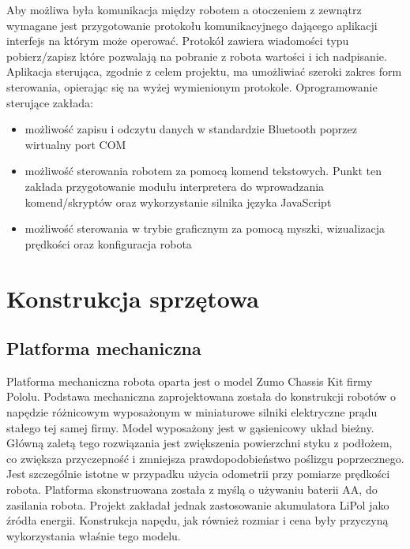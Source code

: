 \documentclass[eng,printmode]{mgr}
\begin{document}
Aby możliwa była komunikacja między robotem a otoczeniem z zewnątrz wymagane jest przygotowanie protokołu komunikacyjnego dającego aplikacji interfejs na którym może operować. Protokół zawiera wiadomości typu pobierz/zapisz które pozwalają na pobranie z robota wartości i ich nadpisanie. Aplikacja sterująca, zgodnie z celem projektu, ma umożliwiać szeroki zakres form sterowania, opierając się na wyżej wymienionym protokole. Oprogramowanie sterujące zakłada:
\begin{itemize}
  \item możliwość zapisu i odczytu danych w standardzie Bluetooth poprzez wirtualny port COM
  \item możliwość sterowania robotem za pomocą komend tekstowych. Punkt ten zakłada przygotowanie modułu interpretera do wprowadzania komend/skryptów oraz wykorzystanie silnika języka JavaScript
  \item możliwość sterowania w trybie graficznym za pomocą myszki, wizualizacja prędkości oraz konfiguracja robota
\end{itemize}

\chapter{Konstrukcja sprzętowa}

 \section{Platforma mechaniczna}

Platforma mechaniczna robota oparta jest o model Zumo Chassis Kit firmy Pololu. Podstawa mechaniczna zaprojektowana została do konstrukcji robotów o napędzie różnicowym wyposażonym w miniaturowe silniki elektryczne prądu stałego tej samej firmy. Model wyposażony jest w gąsienicowy układ bieżny. Główną zaletą tego rozwiązania jest zwiększenia powierzchni styku z podłożem, co zwiększa przyczepność i zmniejsza prawdopodobieństwo poślizgu poprzecznego. Jest szczególnie istotne w przypadku użycia odometrii przy pomiarze prędkości robota. Platforma skonstruowana została z myślą o używaniu baterii AA, do zasilania robota. Projekt zakładał jednak zastosowanie akumulatora LiPol jako źródła energii. Konstrukcja napędu, jak również rozmiar i cena były przyczyną wykorzystania właśnie tego modelu.
\end{document}
